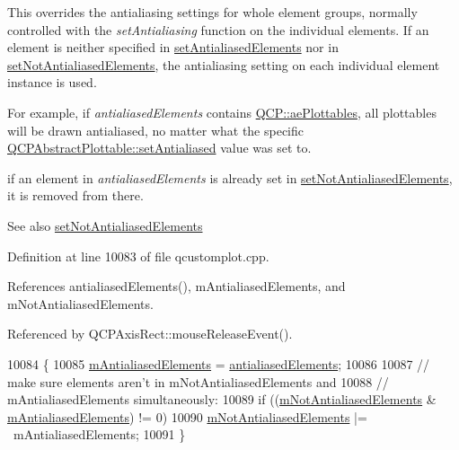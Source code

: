 This overrides the antialiasing settings for whole element groups, normally controlled with the {\itshape set\+Antialiasing} function on the individual elements. If an element is neither specified in \hyperlink{class_q_custom_plot_af6f91e5eab1be85f67c556e98c3745e8}{set\+Antialiased\+Elements} nor in \hyperlink{class_q_custom_plot_ae10d685b5eabea2999fb8775ca173c24}{set\+Not\+Antialiased\+Elements}, the antialiasing setting on each individual element instance is used.

For example, if {\itshape antialiased\+Elements} contains \hyperlink{namespace_q_c_p_ae55dbe315d41fe80f29ba88100843a0ca4145e4251b0cf2dbedabeea0a38f84f6}{Q\+C\+P\+::ae\+Plottables}, all plottables will be drawn antialiased, no matter what the specific \hyperlink{class_q_c_p_layerable_a4fd43e89be4a553ead41652565ff0581}{Q\+C\+P\+Abstract\+Plottable\+::set\+Antialiased} value was set to.

if an element in {\itshape antialiased\+Elements} is already set in \hyperlink{class_q_custom_plot_ae10d685b5eabea2999fb8775ca173c24}{set\+Not\+Antialiased\+Elements}, it is removed from there.

\begin{DoxySeeAlso}{See also}
\hyperlink{class_q_custom_plot_ae10d685b5eabea2999fb8775ca173c24}{set\+Not\+Antialiased\+Elements} 
\end{DoxySeeAlso}


Definition at line 10083 of file qcustomplot.\+cpp.



References antialiased\+Elements(), m\+Antialiased\+Elements, and m\+Not\+Antialiased\+Elements.



Referenced by Q\+C\+P\+Axis\+Rect\+::mouse\+Release\+Event().


\begin{DoxyCode}
10084                                                        \{
10085   \hyperlink{class_q_custom_plot_aa333200629256830e273873b582a5524}{mAntialiasedElements} = \hyperlink{class_q_custom_plot_a81e954fbb485bb44c609e5707f0067b3}{antialiasedElements};
10086 
10087   \textcolor{comment}{// make sure elements aren't in mNotAntialiasedElements and}
10088   \textcolor{comment}{// mAntialiasedElements simultaneously:}
10089   \textcolor{keywordflow}{if} ((\hyperlink{class_q_custom_plot_a2b6ebcad00a90ba07f146cefcd4293da}{mNotAntialiasedElements} & \hyperlink{class_q_custom_plot_aa333200629256830e273873b582a5524}{mAntialiasedElements}) != 0)
10090     \hyperlink{class_q_custom_plot_a2b6ebcad00a90ba07f146cefcd4293da}{mNotAntialiasedElements} |= ~mAntialiasedElements;
10091 \}
\end{DoxyCode}


